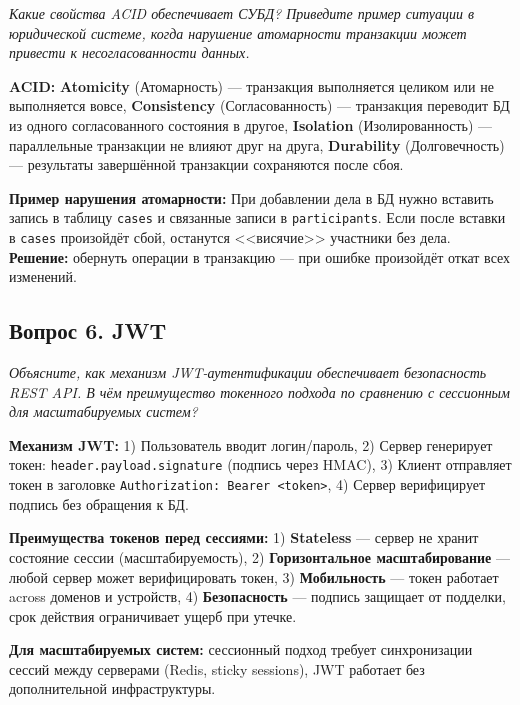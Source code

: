 \documentclass[a4paper,12pt]{article}
\begin{document}
\textit{Какие свойства ACID обеспечивает СУБД? Приведите пример ситуации в юридической системе, когда нарушение атомарности транзакции может привести к несогласованности данных.}

\begin{infobox}
\textbf{ACID:} \textbf{Atomicity} (Атомарность) — транзакция выполняется целиком или не выполняется вовсе, \textbf{Consistency} (Согласованность) — транзакция переводит БД из одного согласованного состояния в другое, \textbf{Isolation} (Изолированность) — параллельные транзакции не влияют друг на друга, \textbf{Durability} (Долговечность) — результаты завершённой транзакции сохраняются после сбоя.

\textbf{Пример нарушения атомарности:} При добавлении дела в БД нужно вставить запись в таблицу \texttt{cases} и связанные записи в \texttt{participants}. Если после вставки в \texttt{cases} произойдёт сбой, останутся <<висячие>> участники без дела. \textbf{Решение:} обернуть операции в транзакцию — при ошибке произойдёт откат всех изменений.
\end{infobox}

\subsection*{Вопрос 6. JWT}

\textit{Объясните, как механизм JWT-аутентификации обеспечивает безопасность REST API. В чём преимущество токенного подхода по сравнению с сессионным для масштабируемых систем?}

\begin{infobox}
\textbf{Механизм JWT:} 1) Пользователь вводит логин/пароль, 2) Сервер генерирует токен: \texttt{header.payload.signature} (подпись через HMAC), 3) Клиент отправляет токен в заголовке \texttt{Authorization: Bearer <token>}, 4) Сервер верифицирует подпись без обращения к БД.

\textbf{Преимущества токенов перед сессиями:} 1) \textbf{Stateless} — сервер не хранит состояние сессии (масштабируемость), 2) \textbf{Горизонтальное масштабирование} — любой сервер может верифицировать токен, 3) \textbf{Мобильность} — токен работает across доменов и устройств, 4) \textbf{Безопасность} — подпись защищает от подделки, срок действия ограничивает ущерб при утечке.

\textbf{Для масштабируемых систем:} сессионный подход требует синхронизации сессий между серверами (Redis, sticky sessions), JWT работает без дополнительной инфраструктуры.
\end{infobox}
\end{document}
